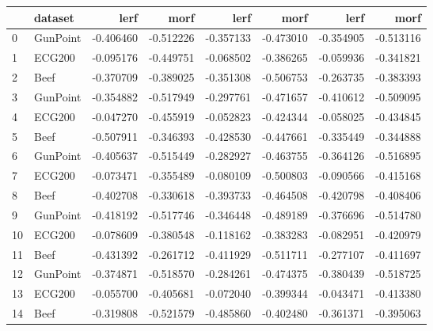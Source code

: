 \begin{tabular}{llrrrrrr}
\toprule
{} &   dataset &      lerf &      morf &      lerf &      morf &      lerf &      morf \\
\midrule
0  &  GunPoint & -0.406460 & -0.512226 & -0.357133 & -0.473010 & -0.354905 & -0.513116 \\
1  &    ECG200 & -0.095176 & -0.449751 & -0.068502 & -0.386265 & -0.059936 & -0.341821 \\
2  &      Beef & -0.370709 & -0.389025 & -0.351308 & -0.506753 & -0.263735 & -0.383393 \\
3  &  GunPoint & -0.354882 & -0.517949 & -0.297761 & -0.471657 & -0.410612 & -0.509095 \\
4  &    ECG200 & -0.047270 & -0.455919 & -0.052823 & -0.424344 & -0.058025 & -0.434845 \\
5  &      Beef & -0.507911 & -0.346393 & -0.428530 & -0.447661 & -0.335449 & -0.344888 \\
6  &  GunPoint & -0.405637 & -0.515449 & -0.282927 & -0.463755 & -0.364126 & -0.516895 \\
7  &    ECG200 & -0.073471 & -0.355489 & -0.080109 & -0.500803 & -0.090566 & -0.415168 \\
8  &      Beef & -0.402708 & -0.330618 & -0.393733 & -0.464508 & -0.420798 & -0.408406 \\
9  &  GunPoint & -0.418192 & -0.517746 & -0.346448 & -0.489189 & -0.376696 & -0.514780 \\
10 &    ECG200 & -0.078609 & -0.380548 & -0.118162 & -0.383283 & -0.082951 & -0.420979 \\
11 &      Beef & -0.431392 & -0.261712 & -0.411929 & -0.511711 & -0.277107 & -0.411697 \\
12 &  GunPoint & -0.374871 & -0.518570 & -0.284261 & -0.474375 & -0.380439 & -0.518725 \\
13 &    ECG200 & -0.055700 & -0.405681 & -0.072040 & -0.399344 & -0.043471 & -0.413380 \\
14 &      Beef & -0.319808 & -0.521579 & -0.485860 & -0.402480 & -0.361371 & -0.395063 \\
\bottomrule
\end{tabular}
